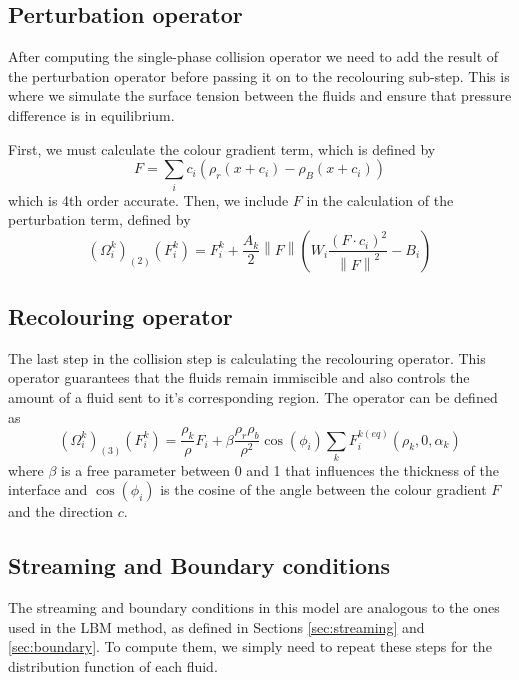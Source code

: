 \documentclass[12pt, openany]{book}
\newcommand{\norm}[1]{\left\lVert#1\right\rVert}
\begin{document}
\subsection{Perturbation operator}
After computing the single-phase collision operator we need to add the result of the perturbation operator before passing it on to the recolouring sub-step. This is where we simulate the surface tension between the fluids and ensure that pressure difference is in equilibrium.\par
First, we must calculate the colour gradient term, which is defined by
\begin{equation}\label{eq:colorGrad}
F = \sum_i c_i \left(\rho_r\left(x+c_i\right) - \rho_B\left(x+c_i\right)\right)
\end{equation}
which is 4th order accurate. Then, we include $F$ in the calculation of the perturbation term, defined by
\begin{equation}\label{eq:pert}
\left(\Omega_i^{k}\right)_{\left(2\right)}\left(F_i^k\right) = F_i^k + \frac{A_k}{2}\norm{F}\left(W_i\frac{\left(F\cdot c_i\right)^2}{\norm{F}^2} - B_i\right)
\end{equation}
\subsection{Recolouring operator}
The last step in the collision step is calculating the recolouring operator. This operator guarantees that the fluids remain immiscible and also controls the amount of a fluid sent to it's corresponding region. The operator can be defined as
\begin{equation}
\left(\Omega_i^{k}\right)_{\left(3\right)}\left(F_i^k\right) = \frac{\rho_k}{\rho}F_i + \beta\frac{\rho_r \rho_b}{\rho^2}\cos \left(\phi_i\right)\sum_k F_i^{k\left(eq\right)}\left(\rho_k,0,\alpha_k\right)
\end{equation}
where $\beta$ is a free parameter between 0 and 1 that influences the thickness of the interface and $\cos \left(\phi_i\right)$ is the cosine of the angle between the colour gradient $F$ and the direction $c$.
\subsection{Streaming and Boundary conditions}
The streaming and boundary conditions in this model are analogous to the ones used in the LBM method, as defined in Sections \ref{sec:streaming} and \ref{sec:boundary}. To compute them, we simply need to repeat these steps for the distribution function of each fluid.
\end{document}
